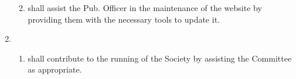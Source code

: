 \documentclass[a4paper]{tufte-handout}
\begin{document}
\begin{enumerate}[resume]
\begin{enumerate}
\begin{enumerate}
                \end{enumerate}
            \item shall assist the Pub. Officer in the maintenance of the website by providing them with the necessary tools to update it.
        \end{enumerate}
    \item {}
        \begin{enumerate}
            \item shall contribute to the running of the Society by assisting the Committee as appropriate.
        \end{enumerate}
\end{enumerate}
\end{document}
